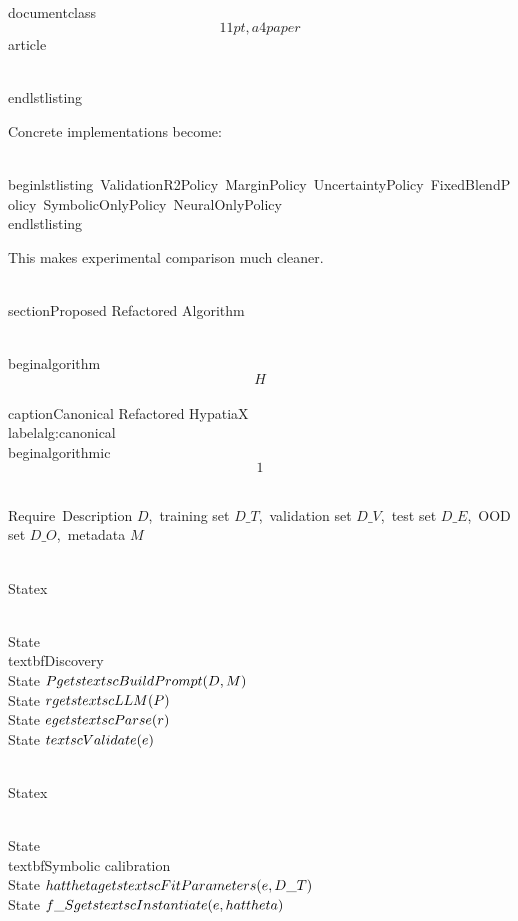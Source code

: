 \\documentclass\[11pt,a4paper\]{article}
\begin{document}
 \\end{lstlisting}

 Concrete implementations become:

 \\begin{lstlisting}\
 ValidationR2Policy\
 MarginPolicy\
 UncertaintyPolicy\
 FixedBlendPolicy\
 SymbolicOnlyPolicy\
 NeuralOnlyPolicy\
 \\end{lstlisting}

 This makes experimental comparison much cleaner.

 \\section{Proposed Refactored Algorithm}\

 \\begin{algorithm}\[H\]\
 \\caption{Canonical Refactored HypatiaX}\
 \\label{alg:canonical}\
 \\begin{algorithmic}\[1\]

 \\Require\
 Description $D$,\
 training set $D\_T$,\
 validation set $D\_V$,\
 test set $D\_E$,\
 OOD set $D\_O$,\
 metadata $M$

 \\Statex

 \\State \\textbf{Discovery}\
 \\State $P\\gets\\textsc{BuildPrompt}(D,M)$\
 \\State $r\\gets\\textsc{LLM}(P)$\
 \\State $e\\gets\\textsc{Parse}(r)$\
 \\State $\\textsc{Validate}(e)$

 \\Statex

 \\State \\textbf{Symbolic calibration}\
 \\State $\\hat{\\theta}\\gets\
 \\textsc{FitParameters}(e,D\_T)$\
 \\State $f\_S\\gets\\textsc{Instantiate}(e,\\hat{\\theta})$
\end{document}
